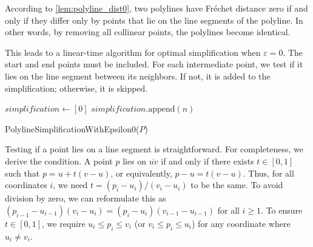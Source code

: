 According to \cref{lem:polyline_dist0}, two polylines have Fréchet distance zero if and only if they differ only by points that lie on the line segments of the polyline. In other words, by removing all collinear points, the polylines become identical.

This leads to a linear-time algorithm for optimal simplification when \(\varepsilon = 0\). The start and end points must be included. For each intermediate point, we test if it lies on the line segment between its neighbors. If not, it is added to the simplification; otherwise, it is skipped.

\begin{algorithm}[ht]
  \DontPrintSemicolon
  \BlankLine
	\(simplification \gets [0]\)\;
	\(simplification.\text{append}(n)\)
  \caption{PolylineSimplificationWithEpsilon0(\(P\))}
  \label{algo:simplify_epsilon0}
\end{algorithm}

Testing if a point lies on a line segment is straightforward. For completeness, we derive the condition. A point \(p\) lies on \(\overline{uv}\) if and only if there exists \(t \in [0,1]\) such that \(p = u + t(v-u)\), or equivalently, \(p - u = t(v-u)\). Thus, for all coordinates \(i\), we need \(t = (p_i - u_i)/(v_i - u_i)\) to be the same. To avoid division by zero, we can reformulate this as \((p_{i-1} - u_{i-1})(v_i - u_i) = (p_i - u_i)(v_{i-1} - u_{i-1})\) for all \(i \geq 1\). To ensure \(t \in [0, 1]\), we require \(u_i \leq p_i \leq v_i\) (or \(v_i \leq p_i \leq u_i\)) for any coordinate where \(u_i \neq v_i\).
